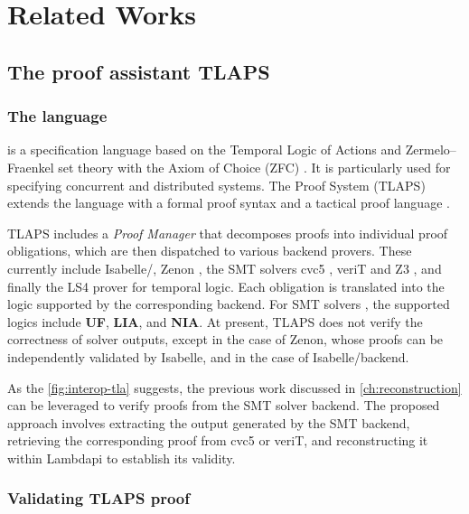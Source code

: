 \chapter{Related Works}\label{ch:relatedworks}

\section{The proof assistant TLAPS}

\subsection{The language}

\tlaplus is a specification language based on the Temporal Logic of Actions and Zermelo–Fraenkel set theory with the Axiom of Choice (ZFC) \cite{tlabook,tla-ref}.
It is particularly used for specifying concurrent and distributed systems.
The \tlaplus Proof System (TLAPS) extends the language with a formal proof syntax and a tactical proof language \cite{tla-proofs}.

TLAPS includes a \emph{Proof Manager} that decomposes proofs into individual proof obligations, which are then dispatched to various backend provers.
These currently include Isabelle/\tlaplus \cite{isabelle-hol-ref}, Zenon \cite{zenonmodulo},
the SMT solvers cvc5 \cite{cvc5}, veriT \cite{verit} and Z3 \cite{z3}, and finally the LS4 prover for temporal logic.
Each obligation is translated into the logic supported by the corresponding backend.
For SMT solvers \cite{new-encoding-tlaps}, the supported logics include \textbf{UF}, \textbf{LIA}, and \textbf{NIA}.
At present, TLAPS does not verify the correctness of solver outputs, except in the case of Zenon, whose proofs can be independently validated by Isabelle,
and in the case of Isabelle/\tlaplus backend.

As the \cref{fig:interop-tla} suggests, the previous work discussed in \cref{ch:reconstruction} can be leveraged to verify \tlaplus proofs from the SMT solver backend.
The proposed approach involves extracting the output generated by the SMT backend, retrieving the corresponding proof from cvc5 or veriT, and reconstructing it within Lambdapi to establish its validity.


\subsection{Validating TLAPS proof}
\label{sec:validating-tlaps-proof}

